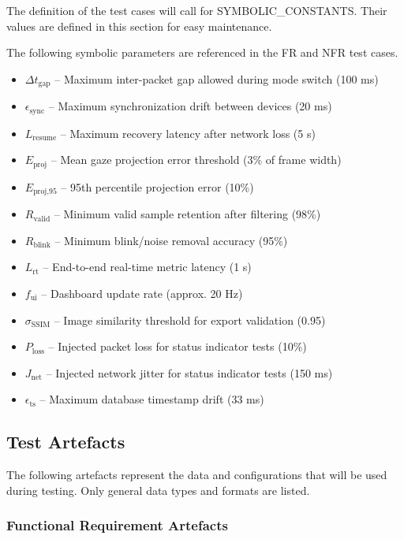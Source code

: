 \documentclass[12pt, titlepage]{article}
\begin{document}
The definition of the test cases will call for SYMBOLIC\_CONSTANTS.
Their values are defined in this section for easy maintenance.

The following symbolic parameters are referenced in the FR and NFR test cases.

\begin{itemize}
  \item $\Delta t_{\text{gap}}$ – Maximum inter-packet gap allowed during mode switch (100 ms)
  \item $\epsilon_{\text{sync}}$ – Maximum synchronization drift between devices (20 ms)
  \item $L_{\text{resume}}$ – Maximum recovery latency after network loss (5 s)
  \item $E_{\text{proj}}$ – Mean gaze projection error threshold (3\% of frame width)
  \item $E_{\text{proj,95}}$ – 95th percentile projection error (10\%)
  \item $R_{\text{valid}}$ – Minimum valid sample retention after filtering (98\%)
  \item $R_{\text{blink}}$ – Minimum blink/noise removal accuracy (95\%)
  \item $L_{\text{rt}}$ – End-to-end real-time metric latency (1 s)
  \item $f_{\text{ui}}$ – Dashboard update rate (approx. 20 Hz)
  \item $\sigma_{\text{SSIM}}$ – Image similarity threshold for export validation (0.95)
  \item $P_{\text{loss}}$ – Injected packet loss for status indicator tests (10\%)
  \item $J_{\text{net}}$ – Injected network jitter for status indicator tests (150 ms)
  \item $\epsilon_{\text{ts}}$ – Maximum database timestamp drift (33 ms)
\end{itemize}

\subsection{Test Artefacts}

The following artefacts represent the data and configurations that will be used
during testing. Only general data types and formats are listed.

\subsubsection*{Functional Requirement Artefacts}
\end{document}
